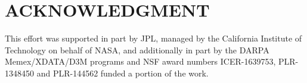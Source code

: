 \documentclass[sigconf]{acmart}
\begin{document}



\maketitle









\section*{ACKNOWLEDGMENT}
This effort was supported in part by JPL, managed by the California Institute of Technology on behalf of NASA, and additionally in part by the DARPA Memex/XDATA/D3M programs and NSF award numbers ICER-1639753, PLR-1348450 and PLR-144562 funded a portion of the work. 


 
\balance
\end{document}
